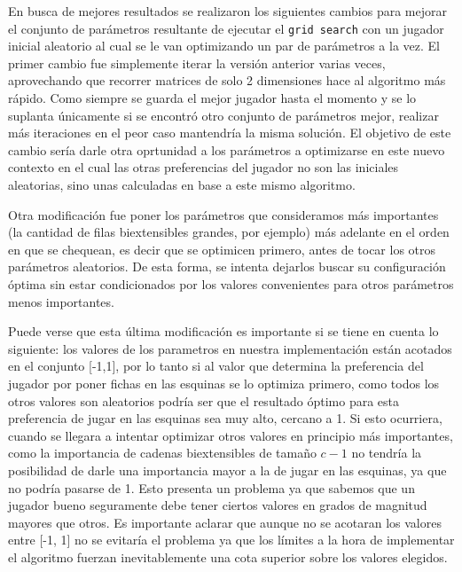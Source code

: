 \documentclass[A4paper,oneside,fleqn,11pt]{article}
\theoremstyle{definition}
\begin{document}
En busca de mejores resultados se realizaron los siguientes cambios para mejorar el conjunto de parámetros resultante de ejecutar el \texttt{grid search} con un jugador inicial aleatorio al cual se le van optimizando un par de parámetros a la vez. El primer cambio fue simplemente iterar la versión anterior varias veces, aprovechando que recorrer matrices de solo 2 dimensiones hace al algoritmo más rápido. Como siempre se guarda el mejor jugador hasta el momento y se lo suplanta únicamente si se encontró otro conjunto de parámetros mejor, realizar más iteraciones en el peor caso mantendría la misma solución. El objetivo de este cambio sería darle otra oprtunidad a los parámetros a optimizarse en este nuevo contexto en el cual las otras preferencias del jugador no son las iniciales aleatorias, sino unas calculadas en base a este mismo algoritmo. 

Otra modificación fue poner los parámetros que consideramos más importantes (la cantidad de filas biextensibles grandes, por ejemplo) más adelante en el orden en que se chequean, es decir que se optimicen primero, antes de tocar los otros parámetros aleatorios. De esta forma, se intenta dejarlos buscar su configuración óptima sin estar condicionados por los valores convenientes para otros parámetros menos importantes. 

Puede verse que esta última modificación es importante si se tiene en cuenta lo siguiente: los valores de los parametros en nuestra implementación están acotados en el conjunto [-1,1], por lo tanto si al valor que determina la preferencia del jugador por poner fichas en las esquinas se lo optimiza primero, como todos los otros valores son aleatorios podría ser que el resultado óptimo para esta preferencia de jugar en las esquinas sea muy alto, cercano a 1. Si esto ocurriera, cuando se llegara a intentar optimizar otros valores en principio más importantes, como la importancia de cadenas biextensibles de tamaño $c-1$ no tendría la posibilidad de darle una importancia mayor a la de jugar en las esquinas, ya que no podría pasarse de 1. Esto presenta un problema ya que sabemos que un jugador bueno seguramente debe tener ciertos valores en grados de magnitud mayores que otros. Es importante aclarar que aunque no se acotaran los valores entre [-1, 1] no se evitaría el problema ya que los límites a la hora de implementar el algoritmo fuerzan inevitablemente una cota superior sobre los valores elegidos.
\end{document}
